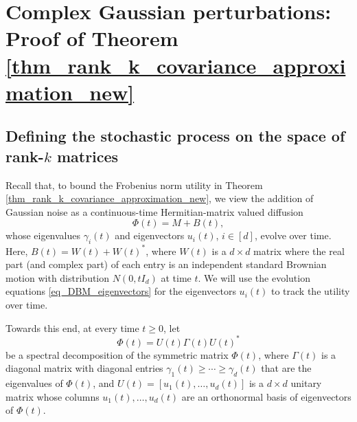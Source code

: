 \documentclass[11pt,letterpaper]{article}
\begin{document}
\color{black}






\section{Complex Gaussian perturbations: Proof of Theorem \ref{thm_rank_k_covariance_approximation_new}}\label{sec_utility}


\subsection{Defining the stochastic process on the space of rank-$k$ matrices}
Recall that, to bound the Frobenius norm utility in Theorem \ref{thm_rank_k_covariance_approximation_new}, we view the addition of Gaussian noise as a continuous-time Hermitian-matrix valued diffusion 
%
\begin{equation}\label{eq_n95}
\Phi(t) = M + B(t),
\end{equation}
%
whose eigenvalues $\gamma_i(t)$ and eigenvectors $u_i(t)$, $i\in [d]$, evolve over time.
%
Here, $B(t) = W(t) + W(t)^\ast$, where $W(t)$ is a $d \times d$ matrix where the real part (and complex part) of each entry is an independent standard Brownian motion with distribution $N(0, tI_d)$ at time $t$.
%
We will use the evolution equations \eqref{eq_DBM_eigenvectors} for the eigenvectors $u_i(t)$ to track the utility over time.

Towards this end, 
%
%
 at every time $t \geq 0$, let
 \begin{equation}\label{eq_n92}
     \Phi(t) = U(t) \Gamma(t) U(t)^\ast
 \end{equation}
  be a spectral decomposition of the symmetric matrix $\Phi(t)$,  where $\Gamma(t)$ is a diagonal matrix with diagonal entries $\gamma_1(t) \geq \cdots \geq \gamma_d(t)$ that are the eigenvalues of $\Phi(t)$, and $U(t) = [u_1(t), \ldots, u_d(t)]$ is a $d\times d$ unitary matrix whose columns $u_1(t), \ldots, u_d(t)$ are an orthonormal basis of eigenvectors of $\Phi(t)$.
\end{document}
